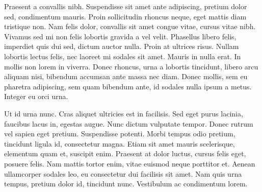 \documentclass{book}
\begin{document}
\pstart Praesent a convallis nibh. Suspendisse sit amet ante adipiscing, pretium dolor sed, condimentum mauris. Proin sollicitudin rhoncus neque, eget mattis diam tristique non. Nam felis dolor, convallis sit amet congue vitae, cursus vitae nibh. Vivamus sed mi non felis lobortis gravida a vel velit. Phasellus libero felis, imperdiet quis dui sed, dictum auctor nulla. Proin at ultrices risus. Nullam lobortis lectus felis, nec laoreet mi sodales sit amet. Mauris in nulla erat. In mollis non lorem in viverra. Donec rhoncus, urna a lobortis tincidunt, libero arcu aliquam nisi, bibendum accumsan ante massa nec diam. Donec mollis, sem eu pharetra adipiscing, sem quam bibendum ante, id sodales nulla ipsum a metus. Integer eu orci urna.
\pend

\pstart {}Ut id urna nunc. Cras aliquet ultricies est in facilisis. Sed eget purus lacinia, faucibus lacus in, egestas augue. Nunc dictum vulputate tempor. Donec rutrum vel sapien eget pretium. Suspendisse potenti. Morbi tempus odio pretium, tincidunt ligula id, consectetur magna. Etiam sit amet mauris scelerisque, elementum quam et, suscipit enim. Praesent at dolor luctus, cursus felis eget, posuere felis. Nam mattis tortor enim, vitae euismod neque porttitor et. Aenean ullamcorper sodales leo, eu consectetur dui facilisis sit amet. Nam quis urna tempus, pretium dolor id, tincidunt nunc. Vestibulum ac condimentum lorem.
\pend

\endnumbering
\end{document}
